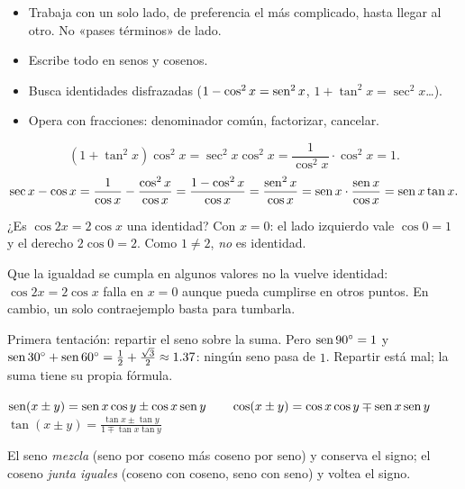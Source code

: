 \documentclass[11pt,a4paper]{article}
\let\nivelorig\nivel
\renewcommand{\nivel}[2]{\Needspace{8\baselineskip}\nivelorig{#1}{#2}}
\begin{document}
\begin{propiedad}
\begin{itemize}
\item Trabaja con un solo lado, de preferencia el más complicado, hasta llegar al otro. No «pases términos» de lado.
\item Escribe todo en senos y cosenos.
\item Busca identidades disfrazadas ($1-\cos^2x=\operatorname{sen}^2x$, $1+\tan^2x=\sec^2x$…).
\item Opera con fracciones: denominador común, factorizar, cancelar.
\end{itemize}
\end{propiedad}

\begin{ejemplo}
\[ (1+\tan^2x)\cos^2x=\sec^2x\cos^2x=\frac{1}{\cos^2x}\cdot\cos^2x=1. \]
\[ \sec x-\cos x=\frac{1}{\cos x}-\frac{\cos^2x}{\cos x}=\frac{1-\cos^2x}{\cos x}=\frac{\operatorname{sen}^2x}{\cos x}=\operatorname{sen} x\cdot\frac{\operatorname{sen} x}{\cos x}=\operatorname{sen} x\tan x. \]
\end{ejemplo}

\begin{ejemplo}
¿Es $\cos 2x=2\cos x$ una identidad? Con $x=0$: el lado izquierdo vale $\cos0=1$ y el derecho $2\cos0=2$. Como $1\neq2$,
\emph{no} es identidad.
\end{ejemplo}

\begin{ojo}
Que la igualdad se cumpla en algunos valores no la vuelve identidad: $\cos2x=2\cos x$ falla en $x=0$ aunque pueda cumplirse
en otros puntos. En cambio, un solo contraejemplo basta para tumbarla.
\end{ojo}


Primera tentación: repartir el seno sobre la suma. Pero $\operatorname{sen}90^\circ=1$ y $\operatorname{sen}30^\circ+\operatorname{sen}60^\circ=\tfrac12+\tfrac{\sqrt3}{2}\approx1.37$:
ningún seno pasa de $1$. Repartir está mal; la suma tiene su propia fórmula.

\begin{clavebox}
$\displaystyle \operatorname{sen}(x\pm y)=\operatorname{sen} x\cos y\pm\cos x\operatorname{sen} y\qquad \cos(x\pm y)=\cos x\cos y\mp\operatorname{sen} x\operatorname{sen} y$\\[6pt]
$\displaystyle \tan(x\pm y)=\frac{\tan x\pm\tan y}{1\mp\tan x\tan y}$
\end{clavebox}
El seno \emph{mezcla} (seno por coseno más coseno por seno) y conserva el signo; el coseno \emph{junta iguales} (coseno con
coseno, seno con seno) y voltea el signo.
\end{document}
